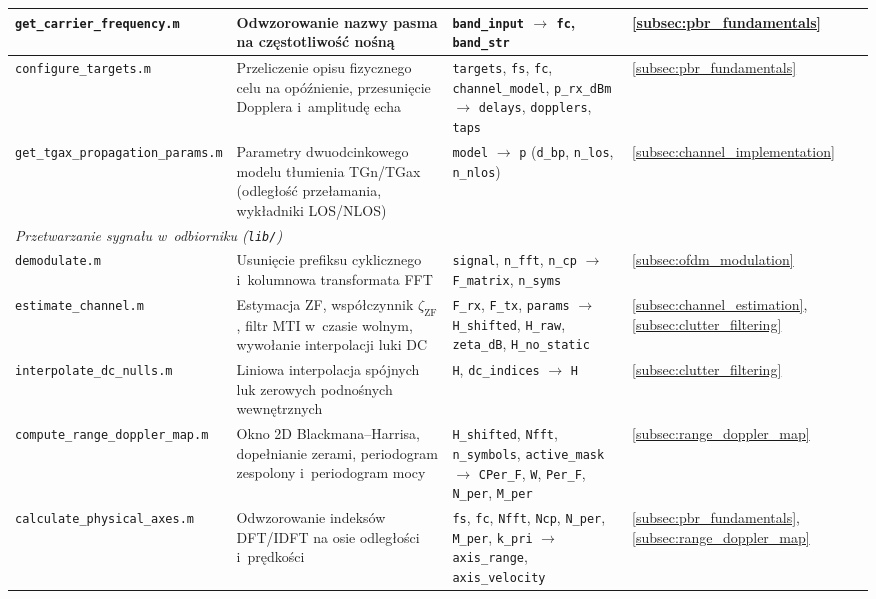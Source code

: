 \begin{table}[H]
\begin{tabular}{|p{3.3cm}|p{4.5cm}|p{4.3cm}|p{2.2cm}|}
        \hline
        \texttt{get\_carrier\_\allowbreak frequency.m} & Odwzorowanie nazwy pasma na częstotliwość nośną & \texttt{band\_input} $\rightarrow$ \texttt{fc}, \texttt{band\_str} & \ref{subsec:pbr_fundamentals} \\
        \hline
        \texttt{configure\_\allowbreak targets.m} & Przeliczenie opisu fizycznego celu na opóźnienie, przesunięcie Dopplera i~amplitudę echa & \texttt{targets}, \texttt{fs}, \texttt{fc}, \texttt{channel\_model}, \texttt{p\_rx\_dBm} $\rightarrow$ \texttt{delays}, \texttt{dopplers}, \texttt{taps} & \ref{subsec:pbr_fundamentals} \\
        \hline
        \texttt{get\_tgax\_\allowbreak propagation\_\allowbreak params.m} & Parametry dwuodcinkowego modelu tłumienia TGn/TGax (odległość przełamania, wykładniki LOS/NLOS) & \texttt{model} $\rightarrow$ \texttt{p} (\texttt{d\_bp}, \texttt{n\_los}, \texttt{n\_nlos}) & \ref{subsec:channel_implementation} \\
        \hline
        \multicolumn{4}{|l|}{\textit{Przetwarzanie sygnału w~odbiorniku (\texttt{lib/})}} \\
        \hline
        \texttt{demodulate.m} & Usunięcie prefiksu cyklicznego i~kolumnowa transformata FFT & \texttt{signal}, \texttt{n\_fft}, \texttt{n\_cp} $\rightarrow$ \texttt{F\_matrix}, \texttt{n\_syms} & \ref{subsec:ofdm_modulation} \\
        \hline
        \texttt{estimate\_\allowbreak channel.m} & Estymacja ZF, współczynnik $\zeta_{\mathrm{ZF}}$, filtr MTI w~czasie wolnym, wywołanie interpolacji luki DC & \texttt{F\_rx}, \texttt{F\_tx}, \texttt{params} $\rightarrow$ \texttt{H\_shifted}, \texttt{H\_raw}, \texttt{zeta\_dB}, \texttt{H\_no\_static} & \ref{subsec:channel_estimation}, \ref{subsec:clutter_filtering} \\
        \hline
        \texttt{interpolate\_\allowbreak dc\_nulls.m} & Liniowa interpolacja spójnych luk zerowych podnośnych wewnętrznych & \texttt{H}, \texttt{dc\_indices} $\rightarrow$ \texttt{H} & \ref{subsec:clutter_filtering} \\
        \hline
        \texttt{compute\_range\_\allowbreak doppler\_map.m} & Okno 2D Blackmana--Harrisa, dopełnianie zerami, periodogram zespolony i~periodogram mocy & \texttt{H\_shifted}, \texttt{Nfft}, \texttt{n\_symbols}, \texttt{active\_mask} $\rightarrow$ \texttt{CPer\_F}, \texttt{W}, \texttt{Per\_F}, \texttt{N\_per}, \texttt{M\_per} & \ref{subsec:range_doppler_map} \\
        \hline
        \texttt{calculate\_\allowbreak physical\_axes.m} & Odwzorowanie indeksów DFT/IDFT na osie odległości i~prędkości & \texttt{fs}, \texttt{fc}, \texttt{Nfft}, \texttt{Ncp}, \texttt{N\_per}, \texttt{M\_per}, \texttt{k\_pri} $\rightarrow$ \texttt{axis\_range}, \texttt{axis\_velocity} & \ref{subsec:pbr_fundamentals}, \ref{subsec:range_doppler_map} \\

\end{tabular}
\end{table}
